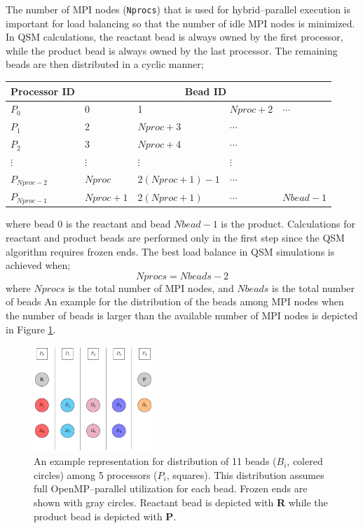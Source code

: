 \documentclass[12pt]{report}
\begin{document}
The number of MPI nodes (\texttt{Nprocs}) 
that is used for hybrid--parallel execution 
is important for load balancing
so that the number of idle MPI nodes 
is minimized. 
In QSM calculations, 
the reactant bead is always owned by the first 
processor, while the product bead is always 
owned by 
the last processor. 
The remaining beads are 
then distributed in a cyclic manner; 
\begin{center}
\renewcommand{\arraystretch}{1.1}
\begin{table}[!ht]
\centering
\begin{tabular}{m{4cm} m{2cm} m{3cm} m{2cm} m{2cm}}
\textbf{Processor} ID & \multicolumn{4}{c}{\textbf{Bead ID}} \\
\hline
$P_0$ & 0 & 1 & $Nproc+2$ & $\cdots$ \\
$P_1$ & 2 & $Nproc+3$ & $\cdots$ & \\
$P_2$ & 3 & $Nproc+4$ & $\cdots$ &  \\
$\vdots$ & $\vdots$ & $\vdots$ & $\vdots$  &  \\
$P_{Nproc-2}$ & $Nproc$  & $2(Nproc+1)-1$ & $\cdots$ & \\
$P_{Nproc-1}$ & $Nproc+1$ & $2(Nproc+1)$ & $\cdots$ & $Nbead-1$
\end{tabular}
\end{table}
\end{center}
\vspace*{-18pt}
where bead $0$ is the reactant and 
bead $Nbead-1$ is 
the product. 
Calculations for reactant and product beads 
are performed only in the first 
step since the QSM algorithm 
requires frozen ends.
The best load balance 
in QSM simulations 
is achieved when;
\begin{equation}
Nprocs = Nbeads - 2 \nonumber
\end{equation} 
where $Nprocs$ is the total 
number of MPI nodes, and $Nbeads$ is 
the total number of beads An example 
for the distribution of the beads among MPI 
nodes when the number of beads is larger than the
available number of MPI nodes is depicted in Figure \ref{fig:loadbalance}.

\begin{center}
\begin{figure}[!ht]
\centering
\includegraphics[width=0.4\textwidth]{manual/load_balance.pdf}
\caption{An example representation for distribution of 11 beads
($B_i$, colered circles) among 5 processors ($P_i$, squares).
This distribution assumes full OpenMP--parallel utilization for each
bead.
Frozen ends are shown with gray circles. Reactant bead is depicted with
\textbf{R} while the product bead is depicted with \textbf{P}.}
\label{fig:loadbalance}
\end{figure}
\end{center}
\end{document}
